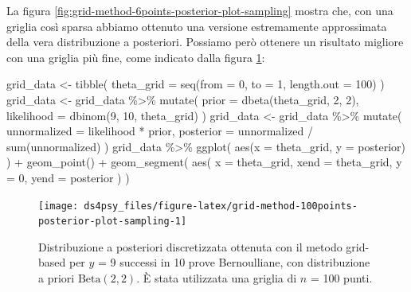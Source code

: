 \documentclass[
  11pt,
]{krantz}
\makeatletter
\newenvironment{Shaded}{\begin{snugshade}}{\end{snugshade}}
\newcommand{\AttributeTok}[1]{\textcolor[rgb]{0.61,0.61,0.61}{#1}}
\newcommand{\DecValTok}[1]{\textcolor[rgb]{0.06,0.06,0.06}{#1}}
\newcommand{\FunctionTok}[1]{\textcolor[rgb]{0,0,0}{#1}}
\newcommand{\NormalTok}[1]{#1}
\newcommand{\OtherTok}[1]{\textcolor[rgb]{0.37,0.37,0.37}{#1}}
\newcommand{\SpecialCharTok}[1]{\textcolor[rgb]{0,0,0}{#1}}
\newenvironment{kframe}{%
\medskip{}
\setlength{\fboxsep}{.8em}
 \def\at@end@of@kframe{}%
 \ifinner\ifhmode%
  \def\at@end@of@kframe{\end{minipage}}%
  \begin{minipage}{\columnwidth}%
 \fi\fi%
 \def\FrameCommand##1{\hskip\@totalleftmargin \hskip-\fboxsep
 \colorbox{shadecolor}{##1}\hskip-\fboxsep
     \hskip-\linewidth \hskip-\@totalleftmargin \hskip\columnwidth}%
 \MakeFramed {\advance\hsize-\width
   \@totalleftmargin\z@ \linewidth\hsize
   \@setminipage}}%
 {\par\unskip\endMakeFramed%
 \at@end@of@kframe}
\renewenvironment{Shaded}{\begin{kframe}}{\end{kframe}}
\theoremstyle{definition}
\theoremstyle{definition}
\theoremstyle{definition}
\theoremstyle{definition}
\theoremstyle{remark}
\makeatother
\begin{document}
La figura \ref{fig:grid-method-6points-posterior-plot-sampling} mostra che, con una griglia così sparsa abbiamo ottenuto una versione estremamente approssimata della vera distribuzione a posteriori. Possiamo però ottenere un risultato migliore con una griglia più fine, come indicato dalla figura \ref{fig:grid-method-100points-posterior-plot-sampling}:

\begin{Shaded}
\begin{Highlighting}[]
\NormalTok{grid\_data }\OtherTok{\textless{}{-}} \FunctionTok{tibble}\NormalTok{(}
  \AttributeTok{theta\_grid =} \FunctionTok{seq}\NormalTok{(}\AttributeTok{from =} \DecValTok{0}\NormalTok{, }\AttributeTok{to =} \DecValTok{1}\NormalTok{, }\AttributeTok{length.out =} \DecValTok{100}\NormalTok{)}
\NormalTok{)}
\NormalTok{grid\_data }\OtherTok{\textless{}{-}}\NormalTok{ grid\_data }\SpecialCharTok{\%\textgreater{}\%}
  \FunctionTok{mutate}\NormalTok{(}
    \AttributeTok{prior =} \FunctionTok{dbeta}\NormalTok{(theta\_grid, }\DecValTok{2}\NormalTok{, }\DecValTok{2}\NormalTok{),}
    \AttributeTok{likelihood =} \FunctionTok{dbinom}\NormalTok{(}\DecValTok{9}\NormalTok{, }\DecValTok{10}\NormalTok{, theta\_grid)}
\NormalTok{  )}
\NormalTok{grid\_data }\OtherTok{\textless{}{-}}\NormalTok{ grid\_data }\SpecialCharTok{\%\textgreater{}\%}
  \FunctionTok{mutate}\NormalTok{(}
    \AttributeTok{unnormalized =}\NormalTok{ likelihood }\SpecialCharTok{*}\NormalTok{ prior,}
    \AttributeTok{posterior =}\NormalTok{ unnormalized }\SpecialCharTok{/} \FunctionTok{sum}\NormalTok{(unnormalized)}
\NormalTok{  )}
\NormalTok{grid\_data }\SpecialCharTok{\%\textgreater{}\%}
  \FunctionTok{ggplot}\NormalTok{(}
    \FunctionTok{aes}\NormalTok{(}\AttributeTok{x =}\NormalTok{ theta\_grid, }\AttributeTok{y =}\NormalTok{ posterior)}
\NormalTok{  ) }\SpecialCharTok{+}
  \FunctionTok{geom\_point}\NormalTok{() }\SpecialCharTok{+}
  \FunctionTok{geom\_segment}\NormalTok{(}
    \FunctionTok{aes}\NormalTok{(}
      \AttributeTok{x =}\NormalTok{ theta\_grid,}
      \AttributeTok{xend =}\NormalTok{ theta\_grid,}
      \AttributeTok{y =} \DecValTok{0}\NormalTok{,}
      \AttributeTok{yend =}\NormalTok{ posterior}
\NormalTok{    )}
\NormalTok{  )}
\end{Highlighting}
\end{Shaded}

\begin{figure}[h]

{\centering \texttt{[image: ds4psy\_files/figure-latex/grid-method-100points-posterior-plot-sampling-1]} 

}

\caption{Distribuzione a posteriori discretizzata ottenuta con il metodo grid-based per $y$ = 9 successi in 10 prove Bernoulliane, con distribuzione a priori $\mbox{Beta}(2, 2)$. È stata utilizzata una griglia di $n$ = 100 punti.}\label{fig:grid-method-100points-posterior-plot-sampling}
\end{figure}
\end{document}
